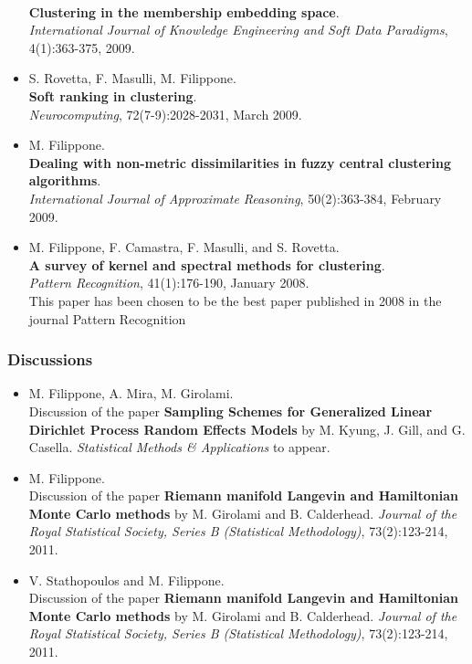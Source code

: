 \documentclass[a4paper,10pt]{article}
\begin{document}
\begin{itemize}
       \\\textbf{Clustering in the membership embedding space}.
       \\\emph{International Journal of Knowledge Engineering and Soft Data Paradigms}, 4(1):363-375, 2009.
     \item  S. Rovetta, F. Masulli, M. Filippone.
       \\\textbf{Soft ranking in clustering}.
       \\\emph{Neurocomputing}, 72(7-9):2028-2031, March 2009.
     \item  M. Filippone.
       \\\textbf{Dealing with non-metric dissimilarities in fuzzy central clustering algorithms}.
       \\\emph{International Journal of Approximate Reasoning}, 50(2):363-384, February 2009.
     \item  M. Filippone, F. Camastra, F. Masulli, and S. Rovetta.
       \\\textbf{A survey of kernel and spectral methods for clustering}.
       \\\emph{Pattern Recognition}, 41(1):176-190, January 2008.
       \\{\footnotesize This paper has been chosen to be the best paper published in 2008 in the journal Pattern Recognition}
\end{itemize}

\subsubsection*{Discussions}
\begin{itemize}
     \item M. Filippone, A. Mira, M. Girolami.
       \\Discussion of the paper \textbf{Sampling Schemes for Generalized Linear Dirichlet Process Random Effects Models} by M. Kyung, J. Gill, and G. Casella.
       \emph{Statistical Methods \& Applications} to appear.
     \item M. Filippone.
       \\Discussion of the paper \textbf{Riemann manifold Langevin and Hamiltonian Monte Carlo methods} by M. Girolami and B. Calderhead. 
       \emph{Journal of the Royal Statistical Society, Series B (Statistical Methodology)}, 73(2):123-214, 2011.
     \item V. Stathopoulos and M. Filippone.
       \\Discussion of the paper \textbf{Riemann manifold Langevin and Hamiltonian Monte Carlo methods} by M. Girolami and B. Calderhead. 
       \emph{Journal of the Royal Statistical Society, Series B (Statistical Methodology)}, 73(2):123-214, 2011.
\end{itemize}
\end{document}
